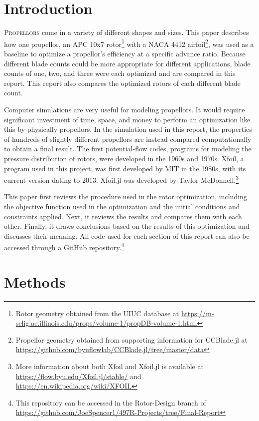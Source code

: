 \documentclass[journal ]{new-aiaa}
\begin{document}
\section{Introduction}

\lettrine{P}{ropellors} come in a variety of different shapes and sizes. This paper describes how one propellor, an APC 10x7 rotor\footnote{Rotor geometry obtained from the UIUC database at \url{https://m-selig.ae.illinois.edu/props/volume-1/propDB-volume-1.html}} with a NACA 4412 airfoil\footnote{Propellor geometry obtained from supporting information for CCBlade.jl at \url{https://github.com/byuflowlab/CCBlade.jl/tree/master/data}}, was used as a baseline to optimize a propellor's efficiency at a specific advance ratio. Because different blade counts could be more appropriate for different applications, blade counts of one, two, and three were each optimized and are compared in this report. This report also compares the optimized rotors of each different blade count.

Computer simulations are very useful for modeling propellors. It would require significant investment of time, space, and money to perform an optimization like this by physically propellors. In the simulation used in this report, the properties of hundreds of slightly different propellors are instead compared computationally to obtain a final result. The first potential-flow codes, programs for modeling the pressure distribution of rotors, were developed in the 1960s and 1970s. Xfoil, a program used in this project, was first developed by MIT in the 1980s, with its current version dating to 2013. Xfoil.jl was developed by Taylor McDonnell.\footnote{More information about both Xfoil and Xfoil.jl is available at \url{https://flow.byu.edu/Xfoil.jl/stable/} and \url{https://en.wikipedia.org/wiki/XFOIL}}

This paper first reviews the procedure used in the rotor optimization, including the objective function used in the optimization and the initial conditions and constraints applied. Next, it reviews the results and compares them with each other. Finally, it draws conclusions based on the results of this optimization and discusses their meaning. All code used for each section of this report can also be accessed through a GitHub repository.\footnote{This repository can be accessed in the Rotor-Design branch of \url{https://github.com/JoeSpencer1/497R-Projects/tree/Final-Report}}


\section{Methods}
\end{document}
